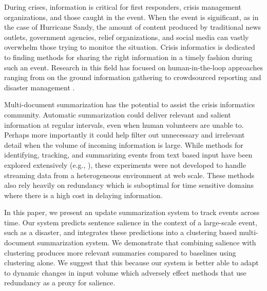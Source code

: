 \label{sec:introduction}
During crises, information is critical for first responders,
 crisis management organizations, and those caught in the event.  
When the event is significant, as in the case of Hurricane
Sandy, the amount of content produced by traditional news outlets,
government agencies, relief organizations, and social media can vastly
overwhelm those trying to monitor the situation. 
Crisis informatics \cite{palen2010vision} is dedicated to finding methods for sharing the
right information in a timely fashion during such an event.
Research in this field has focused on
human-in-the-loop approaches ranging from on the ground information 
gathering to crowdsourced reporting and disaster management \cite{starbird2013working}.

Multi-document summarization has the potential to assist the crisis 
informatics community. 
Automatic summarization could deliver
relevant and salient information at regular intervals, 
even when human volunteers are unable to. 
Perhaps more importantly it could help filter out
unnecessary and irrelevant detail when the volume of incoming information
is large. 
While methods for identifying,
tracking, and summarizing events from text based input have been explored
extensively
(e.g.,
\cite{allan1998topic,Filatova&Hatzivassiloglou.04a,Wang&al.11}), 
these experiments were not developed to handle streaming data from a
 heterogeneous environment at web scale. 
These methods also rely heavily on redundancy which is suboptimal for time
sensitive domains where there is a high cost in delaying information.

In this paper, we present an update summarization system to track events
across time. Our system predicts sentence salience in the context of a
large-scale event, such as a disaster, and integrates these predictions into
a clustering based multi-document summarization system. 
We demonstrate that combining salience with clustering produces more relevant summaries
compared to baselines using clustering alone.  
We suggest that this
because our system is better able to adapt to
dynamic changes in input volume which adversely 
effect methods that use redundancy as a proxy for salience. 


